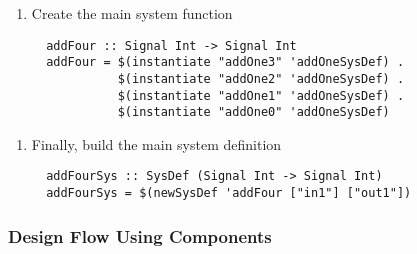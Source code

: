 \documentclass{beamer}
\begin{document}
\begin{frame}[fragile]
\begin{overprint}
   \begin{enumerate}[4)]
   \item Create the main system function
   \begin{lstlisting}
  addFour :: Signal Int -> Signal Int
  addFour = $(instantiate "addOne3" 'addOneSysDef) .
            $(instantiate "addOne2" 'addOneSysDef) .
            $(instantiate "addOne1" 'addOneSysDef) .
            $(instantiate "addOne0" 'addOneSysDef)
   \end{lstlisting}
   \end{enumerate}

   \begin{enumerate}[5)]
   \item Finally, build the main system definition
   \begin{lstlisting}
  addFourSys :: SysDef (Signal Int -> Signal Int)
  addFourSys = $(newSysDef 'addFour ["in1"] ["out1"])
   \end{lstlisting}
   \end{enumerate}

\end{overprint}

\end{frame}


\begin{frame}
  \frametitle{Design Flow Using Components}
\vspace{-0.2cm}
\begin{center}
\end{center}

\end{frame}

\beamerdefaultoverlayspecification{<+->}
\end{document}
